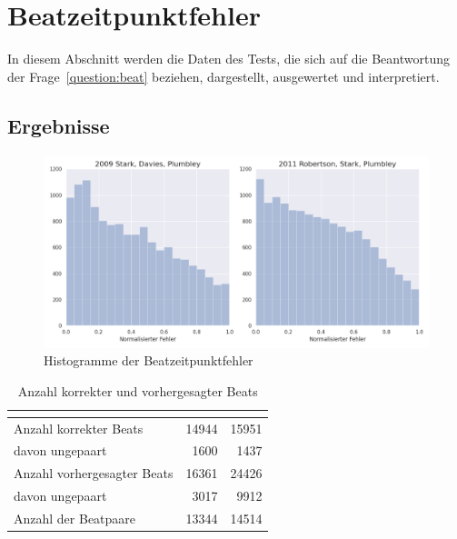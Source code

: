 \section{Beatzeitpunktfehler}
{
	\label{ergebnisse/beatzeitpunktfehler}

	In diesem Abschnitt werden die Daten des Tests,
		die sich auf die Beantwortung der Frage~\ref{question:beat} beziehen,
		dargestellt, ausgewertet und interpretiert.

	\subsection{Ergebnisse}
	{
		\begin{figure}[h]
			\centering
			\includegraphics[scale=0.47]{resources/beat_positions.png}
			\caption{Histogramme der Beatzeitpunktfehler}
			\label{fig:beaterror}
		\end{figure}

		\begin{table}[h]
			\centering
			\begin{tabular}{l | r | r}
				                            & \cite{2009_DaPlSt} & \cite{2011_PlRoSt} \\
				\hline \hline
				Anzahl korrekter Beats      & \num{14944}        & \num{15951}        \\
				davon ungepaart             &  \num{1600}        &  \num{1437}        \\
				\hline
				Anzahl vorhergesagter Beats & \num{16361}        & \num{24426}        \\
				davon ungepaart             &  \num{3017}        &  \num{9912}        \\
				\hline
				Anzahl der Beatpaare        & \num{13344}        & \num{14514}
			\end{tabular}
			\caption{Anzahl korrekter und vorhergesagter Beats}
			\label{tab:pairnum}
		\end{table}

}}
